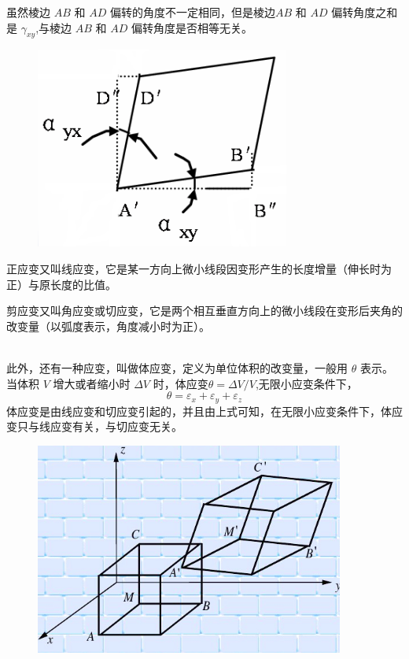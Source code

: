 \documentclass[12pt,a4paper]{article}
\begin{document}
虽然棱边 $AB$ 和 $AD$ 偏转的角度不一定相同，但是棱边$AB$ 和 $AD$ 偏转角度之和是 $\gamma_{xy}$,与棱边 $AB$ 和 $AD$ 偏转角度是否相等无关。

\begin{figure}[H]
\centering
\includegraphics[scale=0.4]{./figures/25.png}
\caption{}
\end{figure}

正应变又叫线应变，它是某一方向上微小线段因变形产生的长度增量（伸长时为正）与原长度的比值。

剪应变又叫角应变或切应变，它是两个相互垂直方向上的微小线段在变形后夹角的改变量（以弧度表示，角度减小时为正）。

~\\

此外，还有一种应变，叫做体应变，定义为单位体积的改变量，一般用 $\theta$ 表示。当体积 $V$ 增大或者缩小时 $\Delta V$ 时，体应变$\theta=\Delta V/V$,无限小应变条件下，
$$
\theta=\varepsilon_x+\varepsilon_y+\varepsilon_z
$$
体应变是由线应变和切应变引起的，并且由上式可知，在无限小应变条件下，体应变只与线应变有关，与切应变无关。

\begin{figure}[H]
\centering
\includegraphics[scale=0.4]{./figures/26.png}
\caption{}
\end{figure}
\end{document}
